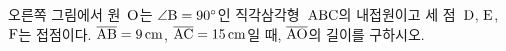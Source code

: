 \noindent\begin{minipage}[t]{0.58\linewidth}\vspace{0pt}\raggedright 오른쪽 그림에서 원~$\mathrm{O}$는 $\angle\mathrm{B}=90^\circ$인 직각삼각형~$\mathrm{ABC}$의 내접원이고 세 점~$\mathrm{D}$, $\mathrm{E}$, $\mathrm{F}$는 접점이다. $\overline{\mathrm{AB}}=9\,\mathrm{cm}$, $\overline{\mathrm{AC}}=15\,\mathrm{cm}$일 때, $\overline{\mathrm{AO}}$의 길이를 구하시오.\end{minipage}\hfill\begin{minipage}[t]{0.4\linewidth}\vspace{0pt}\centering \resizebox{\ifdim\width>\linewidth\linewidth\else\width\fi}{!}{}\end{minipage}\par
